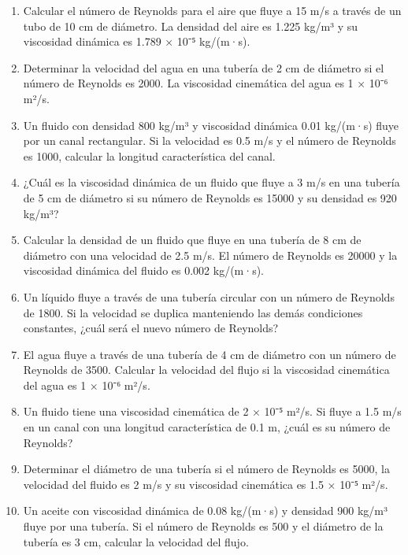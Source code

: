 \documentclass[../main]{subfiles}
\begin{document}
\begin{enumerate}
    \item Calcular el número de Reynolds para el aire que fluye a 15 m/s a través de un tubo de 10 cm de diámetro. La densidad del aire es 1.225 kg/m³ y su viscosidad dinámica es 1.789 × 10⁻⁵ kg/(m·s).
    \item Determinar la velocidad del agua en una tubería de 2 cm de diámetro si el número de Reynolds es 2000. La viscosidad cinemática del agua es 1 × 10⁻⁶ m²/s.
    \item Un fluido con densidad 800 kg/m³ y viscosidad dinámica 0.01 kg/(m·s) fluye por un canal rectangular. Si la velocidad es 0.5 m/s y el número de Reynolds es 1000, calcular la longitud característica del canal.
    \item ¿Cuál es la viscosidad dinámica de un fluido que fluye a 3 m/s en una tubería de 5 cm de diámetro si su número de Reynolds es 15000 y su densidad es 920 kg/m³?
    \item Calcular la densidad de un fluido que fluye en una tubería de 8 cm de diámetro con una velocidad de 2.5 m/s. El número de Reynolds es 20000 y la viscosidad dinámica del fluido es 0.002 kg/(m·s).
    \item Un líquido fluye a través de una tubería circular con un número de Reynolds de 1800. Si la velocidad se duplica manteniendo las demás condiciones constantes, ¿cuál será el nuevo número de Reynolds?
    \item El agua fluye a través de una tubería de 4 cm de diámetro con un número de Reynolds de 3500. Calcular la velocidad del flujo si la viscosidad cinemática del agua es 1 × 10⁻⁶ m²/s.
    \item Un fluido tiene una viscosidad cinemática de 2 × 10⁻⁵ m²/s. Si fluye a 1.5 m/s en un canal con una longitud característica de 0.1 m, ¿cuál es su número de Reynolds?
    \item Determinar el diámetro de una tubería si el número de Reynolds es 5000, la velocidad del fluido es 2 m/s y su viscosidad cinemática es 1.5 × 10⁻⁵ m²/s.
    \item Un aceite con viscosidad dinámica de 0.08 kg/(m·s) y densidad 900 kg/m³ fluye por una tubería. Si el número de Reynolds es 500 y el diámetro de la tubería es 3 cm, calcular la velocidad del flujo.
\end{enumerate}
\end{document}
